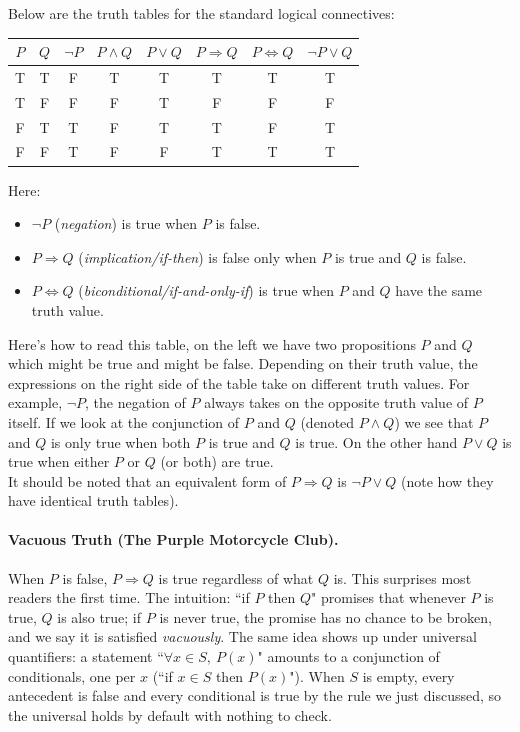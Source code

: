 \noindent Below are the truth tables for the standard logical connectives:

\begin{center}
\begin{tabular}{c c | c c c c c c}
$P$ & $Q$ & $\lnot P$ & $P \land Q$ & $P \lor Q$ & $P \Rightarrow Q$ & $P \Leftrightarrow Q$ & $\lnot P \lor Q$ \\
\hline
T & T & F & T & T & T & T & T \\
T & F & F & F & T & F & F & F \\
F & T & T & F & T & T & F & T \\
F & F & T & F & F & T & T & T \\
\end{tabular}
\end{center}
\vspace{-0.1in}
\noindent Here:
\begin{itemize}
    \item $\lnot P$ (\textit{negation}) is true when $P$ is false.
    \item $P \Rightarrow Q$ (\textit{implication/if-then}) is false only when $P$ is true and $Q$ is false.
    \item $P \Leftrightarrow Q$ (\textit{biconditional/if-and-only-if}) is true when $P$ and $Q$ have the same truth value.
\end{itemize}

\noindent Here's how to read this table, on the left we have two propositions $P$ and 
$Q$ which might be true and might be false. Depending on their truth value, the 
expressions on the right side of the table take on different truth values. For example, 
$\lnot P$, the negation of $P$ always takes on the opposite truth value of $P$ itself. 
If we look at the conjunction of $P$ and $Q$ (denoted $P\land Q$) we see that $P$ and 
$Q$ is only true when both $P$ is true and $Q$ is true. On the other hand $P\lor Q$ is 
true when either $P$ or $Q$ (or both) are true. \\
\noindent It should be noted that an equivalent form of $P \Rightarrow Q$ is $\lnot P \lor Q$ (note how they have identical truth tables).

\paragraph{Vacuous Truth (The Purple Motorcycle Club).}
\label{para:purple-motorcycle-club}
When $P$ is false, $P \Rightarrow Q$ is true regardless of what $Q$ is. This
surprises most readers the first time. The intuition: ``if $P$ then $Q$"
promises that whenever $P$ is true, $Q$ is also true; if $P$ is never true,
the promise has no chance to be broken, and we say it is satisfied
\textit{vacuously}. The same idea shows up under
universal quantifiers: a statement ``$\forall x \in S,\ P(x)$" amounts to a
conjunction of conditionals, one per $x$ (``if $x \in S$ then $P(x)$"). When
$S$ is empty, every antecedent is false and every conditional is true by the
rule we just discussed, so the universal holds by default with nothing to
check.

